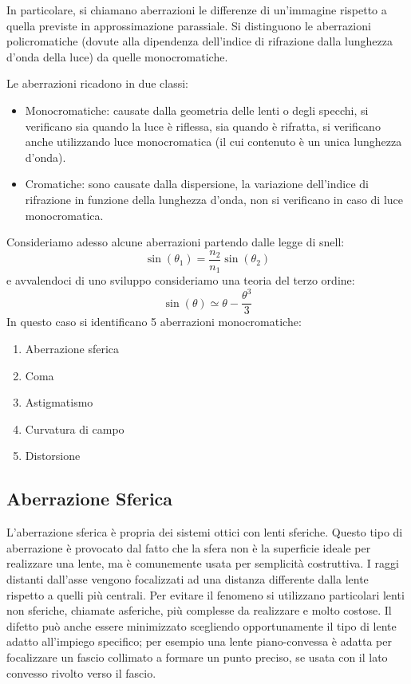 In particolare, si chiamano aberrazioni le differenze di un'immagine rispetto
a quella previste in approssimazione parassiale. Si distinguono le aberrazioni
policromatiche (dovute alla dipendenza dell'indice di rifrazione dalla
lunghezza d'onda della luce) da quelle monocromatiche.

Le aberrazioni ricadono in due classi:
\begin{itemize}
	\item Monocromatiche: causate dalla geometria delle lenti o degli specchi, si verificano sia quando la luce è riflessa, sia quando è rifratta, si verificano anche utilizzando luce monocromatica (il cui contenuto è un unica lunghezza d'onda).
	\item Cromatiche: sono causate dalla dispersione, la variazione dell'indice di rifrazione in funzione della lunghezza d'onda, non si verificano in caso di luce monocromatica.
\end{itemize}
Consideriamo adesso alcune aberrazioni partendo dalle legge di snell:
\[\sin(\theta_1)=\frac{n_2}{n_1 } \sin(\theta_2)\]
e avvalendoci di uno sviluppo consideriamo una teoria del terzo ordine:
\[\sin(\theta) \simeq \theta - \frac{\theta^3}{3}\]
In questo caso si identificano 5 aberrazioni monocromatiche:
\begin{enumerate}
\item Aberrazione sferica
\item Coma
\item Astigmatismo
\item Curvatura di campo
\item Distorsione
\end{enumerate}

\subsection{Aberrazione Sferica} 

L'aberrazione sferica è propria dei sistemi ottici con lenti sferiche. Questo
tipo di aberrazione è provocato dal fatto che la sfera non è la superficie
ideale per realizzare una lente, ma è comunemente usata per semplicità
costruttiva. I raggi distanti dall'asse vengono focalizzati ad una distanza
differente dalla lente rispetto a quelli più centrali. Per evitare il fenomeno
si utilizzano particolari lenti non sferiche, chiamate asferiche, più
complesse da realizzare e molto costose. Il difetto può anche essere
minimizzato scegliendo opportunamente il tipo di lente adatto all'impiego
specifico; per esempio una lente piano-convessa è adatta per focalizzare un
fascio collimato a formare un punto preciso, se usata con il lato convesso
rivolto verso il fascio.

